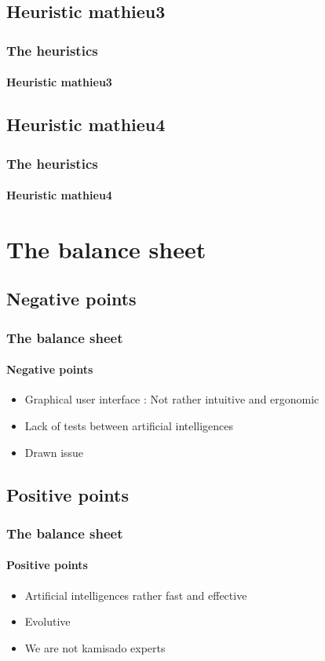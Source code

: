 \documentclass[a4paper, 11pt]{beamer}
\begin{document}
\subsection{Heuristic mathieu3}
\begin{frame}
 \frametitle{The heuristics}
 \framesubtitle{Heuristic mathieu3}
 
\end{frame}

\subsection{Heuristic mathieu4}
\begin{frame}
 \frametitle{The heuristics}
 \framesubtitle{Heuristic mathieu4}
 
\end{frame}

\section{The balance sheet}
\subsection{Negative points}
\begin{frame}
 \frametitle{The balance sheet}
 \framesubtitle{Negative points}
 \begin{itemize}
  \item Graphical user interface : Not rather intuitive and ergonomic
  \item Lack of tests between artificial intelligences
  \item Drawn issue
 \end{itemize}
\end{frame}

\subsection{Positive points}
\begin{frame}
 \frametitle{The balance sheet}
 \framesubtitle{Positive points}
 \begin{itemize}
  \item Artificial intelligences rather fast and effective
  \item Evolutive
  \item We are not kamisado experts
 \end{itemize}
\end{frame}
\end{document}
